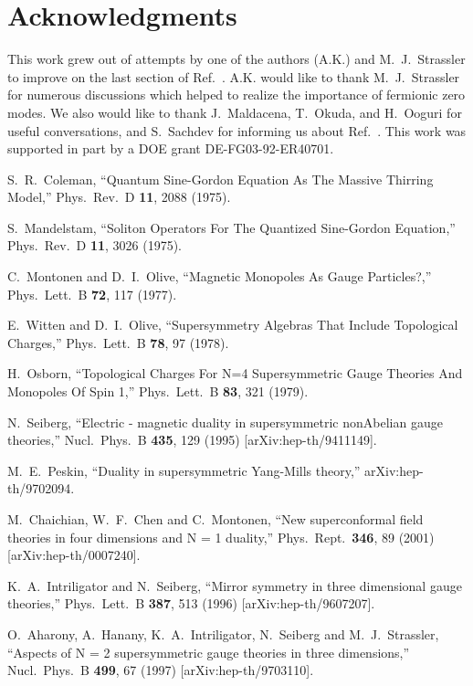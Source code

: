 \documentclass[a4paper,12pt, amsfonts, amssymb]{article}
\begin{document}
\section*{Acknowledgments}
This work grew out of attempts by one of the authors (A.K.) and 
M.~J.~Strassler to improve on the last section of Ref.~\cite{KS}. A.K.
would like to thank M.~J.~Strassler for numerous discussions which
helped to realize the importance of fermionic
zero modes. We also would like to thank J.~Maldacena, T.~Okuda, and
H.~Ooguri for useful conversations, and S.~Sachdev for informing us about Ref.~\cite{MurthySachdev}.
This work was supported in part by a 
DOE grant DE-FG03-92-ER40701.



\begin{thebibliography}{99}

S.~R.~Coleman, ``Quantum Sine-Gordon Equation As The Massive Thirring Model,''
Phys.\ Rev.\ D {\bf 11}, 2088 (1975).

S.~Mandelstam, ``Soliton Operators For The Quantized Sine-Gordon Equation,''
Phys.\ Rev.\ D {\bf 11}, 3026 (1975).

C.~Montonen and D.~I.~Olive,
``Magnetic Monopoles As Gauge Particles?,''
Phys.\ Lett.\ B {\bf 72}, 117 (1977).

E.~Witten and D.~I.~Olive,
``Supersymmetry Algebras That Include Topological Charges,''
Phys.\ Lett.\ B {\bf 78}, 97 (1978).

H.~Osborn,
``Topological Charges For N=4 Supersymmetric Gauge Theories And Monopoles Of Spin 1,'' Phys.\ Lett.\ B {\bf 83}, 321 (1979).

N.~Seiberg, ``Electric - magnetic duality in supersymmetric nonAbelian gauge theories,'' Nucl.\ Phys.\ B {\bf 435}, 129 (1995) [arXiv:hep-th/9411149].

M.~E.~Peskin, ``Duality in supersymmetric Yang-Mills theory,''
arXiv:hep-th/9702094.

M.~Chaichian, W.~F.~Chen and C.~Montonen,
``New superconformal field theories in four dimensions and N = 1 duality,''
Phys.\ Rept.\  {\bf 346}, 89 (2001)
[arXiv:hep-th/0007240].

K.~A.~Intriligator and N.~Seiberg,
``Mirror symmetry in three dimensional gauge theories,''
Phys.\ Lett.\ B {\bf 387}, 513 (1996)
[arXiv:hep-th/9607207].

O.~Aharony, A.~Hanany, K.~A.~Intriligator, N.~Seiberg and M.~J.~Strassler,
``Aspects of N = 2 supersymmetric gauge theories in three dimensions,''
Nucl.\ Phys.\ B {\bf 499}, 67 (1997)
[arXiv:hep-th/9703110].


\end{thebibliography}
\end{document}
